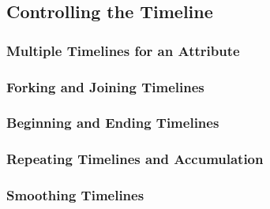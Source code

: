 \label{section-anim-attrs}


\subsection{Controlling the Timeline}

\label{section-anim-timeline}

\subsubsection{Multiple Timelines for an Attribute}

\label{section-anim-ids}

\subsubsection{Forking and Joining Timelines}

\label{section-anim-fork}


\subsubsection{Beginning and Ending Timelines}

\subsubsection{Repeating Timelines and Accumulation}

\subsubsection{Smoothing Timelines}



\endinput


Creating an animation is done using the following command:


